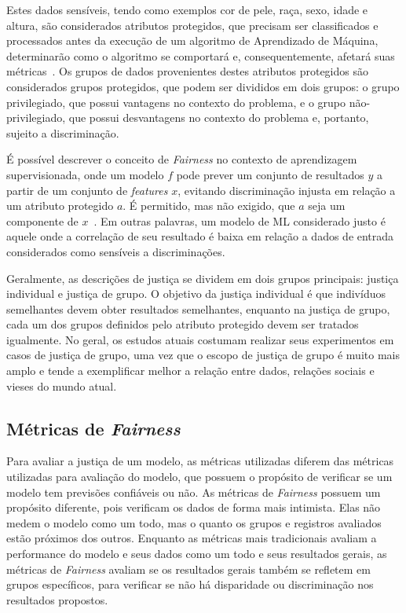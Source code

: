 \documentclass[portugues]{ic-tese}
\begin{document}
Estes dados sensíveis, tendo como exemplos cor de pele, raça, sexo, idade e altura, são considerados atributos protegidos, que precisam ser classificados e processados antes da execução de um algoritmo de Aprendizado de Máquina, determinarão como o algoritmo se comportará e, consequentemente, afetará suas métricas~\citep{Mougan_2022}. Os grupos de dados provenientes destes atributos protegidos são considerados grupos protegidos, que podem ser divididos em dois grupos: o grupo privilegiado, que possui vantagens no contexto do problema, e o grupo não-privilegiado, que possui desvantagens no contexto do problema e, portanto, sujeito a discriminação.

É possível descrever o conceito de \textit{Fairness} no contexto de aprendizagem supervisionada, onde um modelo $f$ pode prever um conjunto de resultados $y$ a partir de um conjunto de \textit{features} $x$, evitando discriminação injusta em relação a um atributo protegido $a$. É permitido, mas não exigido, que $a$ seja um componente de $x$~\citep{Begley_2021}. Em outras palavras, um modelo de ML considerado justo é aquele onde a correlação de seu resultado é baixa em relação a dados de entrada considerados como sensíveis a discriminações.

Geralmente, as descrições de justiça se dividem em dois grupos principais: justiça individual e justiça de grupo. O objetivo da justiça individual é que indivíduos semelhantes devem obter resultados semelhantes, enquanto na justiça de grupo, cada um dos grupos definidos pelo atributo protegido devem ser tratados igualmente. No geral, os estudos atuais costumam realizar seus experimentos em casos de justiça de grupo, uma vez que o escopo de justiça de grupo é muito mais amplo e tende a exemplificar melhor a relação entre dados, relações sociais e vieses do mundo atual.

\subsection{Métricas de \textit{Fairness}}
\label{sec:FairnessMetrics}

Para avaliar a justiça de um modelo, as métricas utilizadas diferem das métricas utilizadas para avaliação do modelo, que possuem o propósito de verificar se um modelo tem previsões confiáveis ou não. As métricas de \textit{Fairness} possuem um propósito diferente, pois verificam os dados de forma mais intimista. Elas não medem o modelo como um todo, mas o quanto os grupos e registros avaliados estão próximos dos outros. Enquanto as métricas mais tradicionais avaliam a performance do modelo e seus dados como um todo e seus resultados gerais, as métricas de \textit{Fairness} avaliam se os resultados gerais também se refletem em grupos específicos, para verificar se não há disparidade ou discriminação nos resultados propostos.
\end{document}
